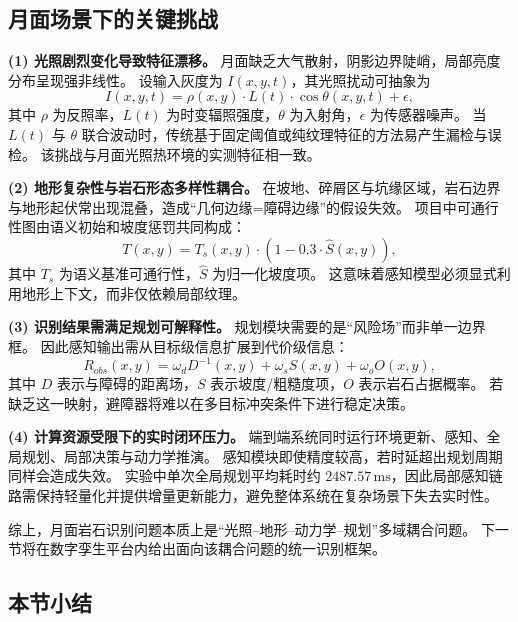 \documentclass[UTF8,zihao=-4,a4paper,oneside,openany]{ctexrep}
\numberwithin{equation}{chapter}
\theoremstyle{plain}
\theoremstyle{definition}
\begin{document}
\subsection{月面场景下的关键挑战}

\textbf{(1) 光照剧烈变化导致特征漂移。}
月面缺乏大气散射，阴影边界陡峭，局部亮度分布呈现强非线性。
设输入灰度为 $I(x,y,t)$，其光照扰动可抽象为
\begin{equation}
I(x,y,t)=\rho(x,y)\cdot L(t)\cdot \cos\theta(x,y,t)+\epsilon,
\label{eq:ch5_lighting}
\end{equation}
其中 $\rho$ 为反照率，$L(t)$ 为时变辐照强度，$\theta$ 为入射角，$\epsilon$ 为传感器噪声。
当 $L(t)$ 与 $\theta$ 联合波动时，传统基于固定阈值或纯纹理特征的方法易产生漏检与误检。
该挑战与月面光照热环境的实测特征相一致\cite{paige2010diviner,heiken1991lunar}。

\textbf{(2) 地形复杂性与岩石形态多样性耦合。}
在坡地、碎屑区与坑缘区域，岩石边界与地形起伏常出现混叠，造成“几何边缘=障碍边缘”的假设失效。
项目中可通行性图由语义初始和坡度惩罚共同构成：
\begin{equation}
T(x,y)=T_s(x,y)\cdot \left(1-0.3\cdot \hat{S}(x,y)\right),
\label{eq:ch5_traversability}
\end{equation}
其中 $T_s$ 为语义基准可通行性，$\hat{S}$ 为归一化坡度项。
这意味着感知模型必须显式利用地形上下文，而非仅依赖局部纹理。

\textbf{(3) 识别结果需满足规划可解释性。}
规划模块需要的是“风险场”而非单一边界框。
因此感知输出需从目标级信息扩展到代价级信息：
\begin{equation}
R_{obs}(x,y)=\omega_d D^{-1}(x,y)+\omega_s S(x,y)+\omega_o O(x,y),
\label{eq:ch5_risk_field}
\end{equation}
其中 $D$ 表示与障碍的距离场，$S$ 表示坡度/粗糙度项，$O$ 表示岩石占据概率。
若缺乏这一映射，避障器将难以在多目标冲突条件下进行稳定决策。

\textbf{(4) 计算资源受限下的实时闭环压力。}
端到端系统同时运行环境更新、感知、全局规划、局部决策与动力学推演。
感知模块即使精度较高，若时延超出规划周期同样会造成失效。
实验中单次全局规划平均耗时约 $2487.57\,\mathrm{ms}$\cite{wang2026raumfahrt}，因此局部感知链路需保持轻量化并提供增量更新能力，避免整体系统在复杂场景下失去实时性。

综上，月面岩石识别问题本质上是“光照--地形--动力学--规划”多域耦合问题。
下一节将在数字孪生平台内给出面向该耦合问题的统一识别框架。

\subsection{本节小结}
\end{document}
